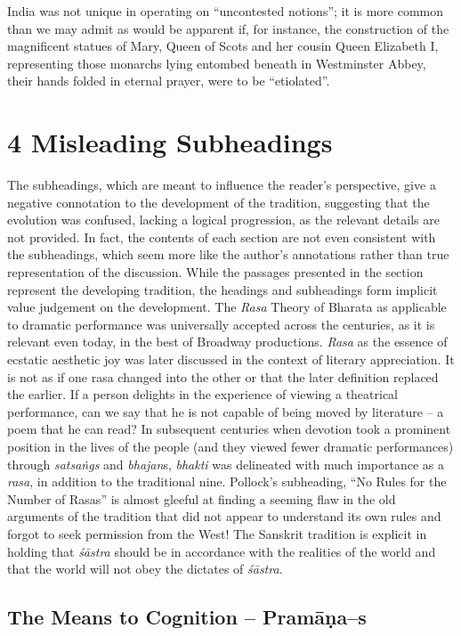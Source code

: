 India was not unique in operating on “uncontested notions”; it is more common than we may admit as would be apparent if, for instance, the construction of the magnificent statues of Mary, Queen of Scots and her cousin Queen Elizabeth I, representing those monarchs lying entombed beneath in Westminster Abbey, their hands folded in eternal prayer, were to be “etiolated”.


\section*{4 Misleading Subheadings}

The subheadings, which are meant to influence the reader’s perspective, give a negative connotation to the development of the tradition, suggesting that the evolution was confused, lacking a logical progression, as the relevant details are not provided. In fact, the contents of each section are not even consistent with the subheadings, which seem more like the author’s annotations rather than true representation of the discussion. While the passages presented in the section represent the developing tradition, the headings and subheadings form implicit value judgement on the development. The \textit{Rasa} Theory of Bharata as applicable to dramatic performance was universally accepted across the centuries, as it is relevant even today, in the best of Broadway productions. \textit{Rasa} as the essence of ecstatic aesthetic joy was later discussed in the context of literary appreciation. It is not as if one rasa changed into the other or that the later definition replaced the earlier. If a person delights in the experience of viewing a theatrical performance, can we say that he is not capable of being moved by literature – a poem that he can read? In subsequent centuries when devotion took a prominent position in the lives of the people (and they viewed fewer dramatic performances) through \textit{satsaṅgs} and \textit{bhajan}s, \textit{bhakti} was delineated with much importance as a \textit{rasa}, in addition to the traditional nine. Pollock’s subheading, “No Rules for the Number of Rasas” is almost gleeful at finding a seeming flaw in the old arguments of the tradition that did not appear to understand its own rules and forgot to seek permission from the West! The Sanskrit tradition is explicit in holding that \textit{śāstra} should be in accordance with the realities of the world and that the world will not obey the dictates of \textit{śāstra}.

\subsection*{The Means to Cognition – Pramāṇa–s}

